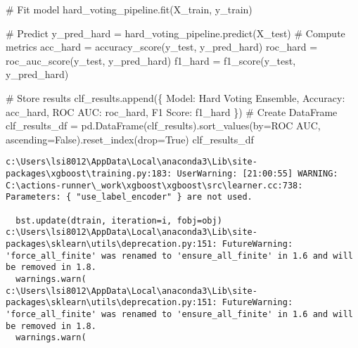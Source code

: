 \documentclass[
  letterpaper,
  DIV=11,
  numbers=noendperiod]{scrreprt}
\newenvironment{Shaded}{\begin{snugshade}}{\end{snugshade}}
\newcommand{\CommentTok}[1]{\textcolor[rgb]{0.37,0.37,0.37}{#1}}
\newcommand{\NormalTok}[1]{\textcolor[rgb]{0.00,0.23,0.31}{#1}}
\newcommand{\OperatorTok}[1]{\textcolor[rgb]{0.37,0.37,0.37}{#1}}
\newcommand{\StringTok}[1]{\textcolor[rgb]{0.13,0.47,0.30}{#1}}
\newcommand{\VariableTok}[1]{\textcolor[rgb]{0.07,0.07,0.07}{#1}}
\begin{document}
\begin{Shaded}
\begin{Highlighting}[]
\CommentTok{\# Fit model}
\NormalTok{hard\_voting\_pipeline.fit(X\_train, y\_train)}

\CommentTok{\# Predict}
\NormalTok{y\_pred\_hard }\OperatorTok{=}\NormalTok{ hard\_voting\_pipeline.predict(X\_test)}
\CommentTok{\# Compute metrics}
\NormalTok{acc\_hard }\OperatorTok{=}\NormalTok{ accuracy\_score(y\_test, y\_pred\_hard)}
\NormalTok{roc\_hard }\OperatorTok{=}\NormalTok{ roc\_auc\_score(y\_test, y\_pred\_hard)}
\NormalTok{f1\_hard }\OperatorTok{=}\NormalTok{ f1\_score(y\_test, y\_pred\_hard)}

\CommentTok{\# Store results}
\NormalTok{clf\_results.append(\{}
    \StringTok{\textquotesingle{}Model\textquotesingle{}}\NormalTok{: }\StringTok{\textquotesingle{}Hard Voting Ensemble\textquotesingle{}}\NormalTok{,}
    \StringTok{\textquotesingle{}Accuracy\textquotesingle{}}\NormalTok{: acc\_hard,}
    \StringTok{\textquotesingle{}ROC AUC\textquotesingle{}}\NormalTok{: roc\_hard,}
    \StringTok{\textquotesingle{}F1 Score\textquotesingle{}}\NormalTok{: f1\_hard}
\NormalTok{\})}
\CommentTok{\# Create DataFrame}
\NormalTok{clf\_results\_df }\OperatorTok{=}\NormalTok{ pd.DataFrame(clf\_results).sort\_values(by}\OperatorTok{=}\StringTok{\textquotesingle{}ROC AUC\textquotesingle{}}\NormalTok{, ascending}\OperatorTok{=}\VariableTok{False}\NormalTok{).reset\_index(drop}\OperatorTok{=}\VariableTok{True}\NormalTok{)}
\NormalTok{clf\_results\_df}
\end{Highlighting}
\end{Shaded}

\begin{verbatim}
c:\Users\lsi8012\AppData\Local\anaconda3\Lib\site-packages\xgboost\training.py:183: UserWarning: [21:00:55] WARNING: C:\actions-runner\_work\xgboost\xgboost\src\learner.cc:738: 
Parameters: { "use_label_encoder" } are not used.

  bst.update(dtrain, iteration=i, fobj=obj)
c:\Users\lsi8012\AppData\Local\anaconda3\Lib\site-packages\sklearn\utils\deprecation.py:151: FutureWarning: 'force_all_finite' was renamed to 'ensure_all_finite' in 1.6 and will be removed in 1.8.
  warnings.warn(
c:\Users\lsi8012\AppData\Local\anaconda3\Lib\site-packages\sklearn\utils\deprecation.py:151: FutureWarning: 'force_all_finite' was renamed to 'ensure_all_finite' in 1.6 and will be removed in 1.8.
  warnings.warn(
\end{verbatim}
\end{document}
